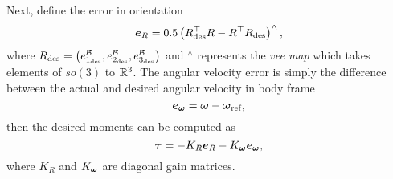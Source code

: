 Next, define the error in orientation
\begin{equation*}
    \boldsymbol{e}_{R} = 0.5 \left( R_{\text{des}}^{\top} R - R^{\top} R_{\text{des}} \right)^{\land},
\end{equation*}
where $R_{\text{des}} = \left( e_{1_{\text{des}}}^{\mathcal{B}}, e_{2_{\text{des}}}^{\mathcal{B}}, e_{3_{\text{des}}}^{\mathcal{B}}\right)$ and $^{\land}$
represents the \emph{vee map} which takes elements of $so(3)$ to $\mathbb{R}^3$.
The angular velocity error is simply the difference between the actual and desired angular velocity in body frame
\begin{equation*}
    \boldsymbol{e}_{\boldsymbol{\omega}} = \boldsymbol{\omega} - \boldsymbol{\omega}_{\text{ref}},
\end{equation*}
then the desired moments can be computed as
\begin{equation*}
    \boldsymbol{\tau} = -K_R \boldsymbol{e}_R -K_{\boldsymbol{\omega}} \boldsymbol{e}_{\boldsymbol{\omega}},
\end{equation*}
where $K_R$ and $K_{\boldsymbol{\omega}}$ are diagonal gain matrices.

